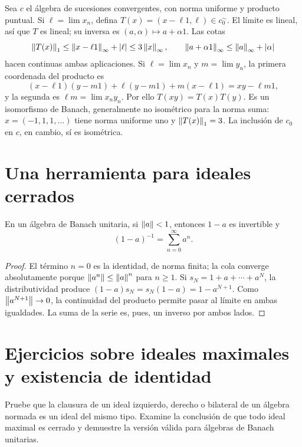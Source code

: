 \begin{ejemplo}
Sea $c$ el álgebra de sucesiones convergentes, con norma uniforme y producto puntual. Si $\ell=\lim x_n$, defina $T(x)=(x-\ell1,\ell)\in c_0^{\sim}$. El límite es lineal, así que $T$ es lineal; su inversa es $(a,\alpha)\mapsto a+\alpha1$. Las cotas
\[
 \left\lVert T(x)\right\rVert_1\leq\left\lVert x-\ell1\right\rVert_\infty+|\ell|
 \leq3\left\lVert x\right\rVert_\infty,
 \qquad \left\lVert a+\alpha1\right\rVert_\infty\leq\left\lVert a\right\rVert_\infty+|\alpha|
\]
hacen continuas ambas aplicaciones. Si $\ell=\lim x_n$ y $m=\lim y_n$, la primera coordenada del producto es
\[
 (x-\ell1)(y-m1)+\ell(y-m1)+m(x-\ell1)=xy-\ell m1,
\]
y la segunda es $\ell m=\lim x_ny_n$. Por ello $T(xy)=T(x)T(y)$. Es un isomorfismo de Banach, generalmente no isométrico para la norma suma: $x=(-1,1,1,\ldots)$ tiene norma uniforme uno y $\left\lVert T(x)\right\rVert_1=3$. La inclusión de $c_0$ en $c$, en cambio, sí es isométrica.
\end{ejemplo}

\section{Una herramienta para ideales cerrados}

\begin{lema}\label{v3:neumann-basico}
En un álgebra de Banach unitaria, si $\left\lVert a\right\rVert<1$, entonces $1-a$ es invertible y
\[
 (1-a)^{-1}=\sum_{n=0}^\infty a^n.
\]
\end{lema}
\begin{proof}
El término $n=0$ es la identidad, de norma finita; la cola converge absolutamente porque $\left\lVert a^n\right\rVert\leq\left\lVert a\right\rVert^n$ para $n\geq1$. Si $s_N=1+a+\cdots+a^N$, la distributividad produce $(1-a)s_N=s_N(1-a)=1-a^{N+1}$. Como $\left\lVert a^{N+1}\right\rVert\to0$, la continuidad del producto permite pasar al límite en ambas igualdades. La suma de la serie es, pues, un inverso por ambos lados.
\end{proof}

\section{Ejercicios sobre ideales maximales y existencia de identidad}

\begin{ejercicio}\label{ej:v3-l20-1}
Pruebe que la clausura de un ideal izquierdo, derecho o bilateral de un álgebra normada es un ideal del mismo tipo. Examine la conclusión de que todo ideal maximal es cerrado y demuestre la versión válida para álgebras de Banach unitarias.
\end{ejercicio}


